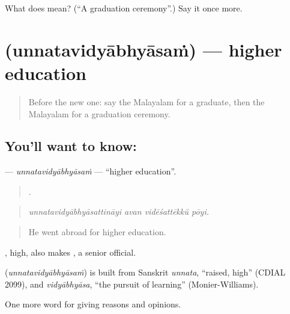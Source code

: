 \begin{tcolorbox}[breakable,colback=teal!4,colframe=teal!35!black,title={Before you move on}]
What does  mean? (\textquotedblleft{}A graduation ceremony\textquotedblright{}.) Say it once more.
\end{tcolorbox}
\section[\texorpdfstring{\ml{ഉന്നതവിദ്യാഭ്യാസം} (unnatavidyābhyāsaṁ)}{ഉന്നതവിദ്യാഭ്യാസം (unnatavidyābhyāsaṁ)}]{ (unnatavidyābhyāsaṁ) — higher education}

\label{lesson:ML-C435-unnatavidyabhyasam}



\begin{quote}
Before the new one: say the Malayalam for a graduate, then the Malayalam for a graduation ceremony.
\end{quote}

\subsection*{You'll want to know: }
\textbf{} — \emph{unnatavidyābhyāsaṁ} — \textquotedblleft{}higher education\textquotedblright{}.

\begin{quote}
   .
\end{quote}

\begin{quote}
\emph{unnatavidyābhyāsattināyi avan vidēśattēkkŭ pōyi.}
\end{quote}

\begin{quote}
He went abroad for higher education.
\end{quote}

, high, also makes  , a senior official.

\begin{cousinweb}
\textbf{} (\emph{unnatavidyābhyāsaṁ}) is built from Sanskrit \emph{unnata}, \textquotedblleft{}raised, high\textquotedblright{} (CDIAL 2099), and \emph{vidyābhyāsa}, \textquotedblleft{}the pursuit of learning\textquotedblright{} (Monier-Williams).
\end{cousinweb}

\begin{grammarlens}[title={What you've built}]
One more word for giving reasons and opinions.
\end{grammarlens}

